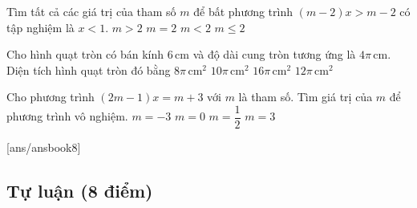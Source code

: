 \begin{ex}
Tìm tất cả các giá trị của tham số $m$ để bất phương trình $(m-2)x>m-2$ có tập nghiệm là $x<1$.
\choice
{$m>2$}
{$m=2$}
{\True $m<2$}
{$m\le 2$}
\end{ex}

\begin{ex}
Cho hình quạt tròn có bán kính $6\,\text{cm}$ và độ dài cung tròn tương ứng là $4\pi\,\text{cm}$. Diện tích hình quạt tròn đó bằng
\choice
{$8\pi\,\text{cm}^2$}
{$10\pi\,\text{cm}^2$}
{$16\pi\,\text{cm}^2$}
{\True $12\pi\,\text{cm}^2$}
\end{ex}

\begin{ex}
Cho phương trình $(2m-1)x=m+3$ với $m$ là tham số. Tìm giá trị của $m$ để phương trình vô nghiệm.
\choice
{$m=-3$}
{$m=0$}
{\True $m=\dfrac{1}{2}$}
{$m=3$}
\end{ex}


[ans/ansbook8]
\setcounter{bt}{0}
\subsection{Tự luận (8 điểm)}

